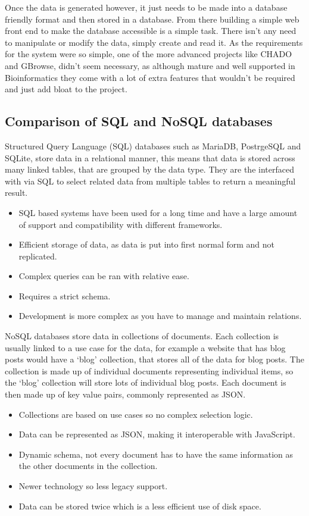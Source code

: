 Once the data is generated however, it just needs to be made into a database friendly format and then stored in a database. From there building a simple web front end to make the database accessible is a simple task. There isn't any need to manipulate or modify the data, simply create and read it. As the requirements for the system were so simple, one of the more advanced projects like CHADO and GBrowse, didn't seem necessary, as although mature and well supported in Bioinformatics they come with a lot of extra features that wouldn't be required and just add bloat to the project. 

  \subsection{Comparison of SQL and NoSQL databases}
  Structured Query Language (SQL) databases such as MariaDB, PostrgeSQL and SQLite, store data in a relational manner, this means that data is stored across many linked tables, that are grouped by the data type. They are the interfaced with via SQL to select related data from multiple tables to return a meaningful result. 
  
  \begin{itemize}
    \item SQL based systems have been used for a long time and have a large amount of support and compatibility with different frameworks. 
    \item Efficient storage of data, as data is put into first normal form and not replicated.
    \item Complex queries can be ran with relative ease.
    \item Requires a strict schema.
    \item Development is more complex as you have to manage and maintain relations.
  \end{itemize}

  NoSQL databases store data in collections of documents. Each collection is usually linked to a use case for the data, for example a website that has blog posts would have a `blog' collection, that stores all of the data for blog posts. The collection is made up of individual documents representing individual items, so the `blog' collection will store lots of individual blog posts. Each document is then made up of key value pairs, commonly represented as JSON.\@

  \begin{itemize}
    \item Collections are based on use cases so no complex selection logic.
    \item Data can be represented as JSON, making it interoperable with JavaScript.
    \item Dynamic schema, not every document has to have the same information as the other documents in the collection.
    \item Newer technology so less legacy support.
    \item Data can be stored twice which is a less efficient use of disk space.
  \end{itemize}

